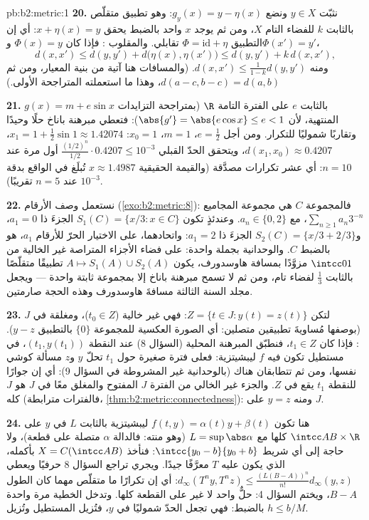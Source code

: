 \begin{solution}{pb:b2:metric:1}
\textbf{20.} نثبّت $y \in X$ ونضع $g_y(x) = y - \eta(x)$: وهو
تطبيق متقلّص بالثابت $k$ للفضاء التام $X$، ومن ثم يوجد $x$ واحد بالضبط
يحقق $x + \eta(x) = y$: أي إن التطبيق $\Phi = \mathrm{id} + \eta$
تقابلي. والمقلوب : فإذا كان $\Phi(x) = y$ و$\Phi(x') =
y'$،
\[
d(x, x') \leq d(y, y') + d\bigl(\eta(x), \eta(x')\bigr)
\leq d(y, y') + k\,d(x, x'),
\]
ومنه $d(x, x') \leq \frac{1}{1-k}d(y, y')$. (والمسافات هنا آتية
من بنية المعيار، ومن ثم $d(a - c, b - c) = d(a, b)$، وهذا ما
استعملته المتراجحة الأولى.)

\textbf{21.} $g(x) = m + e\sin x$  بالثابت $e$ على الفترة
التامة $\R$ (بمتراجحة التزايدات المنتهية، لأن $\abs{g'} = \abs{e\cos x}
\leq e < 1$): فتعطي مبرهنة باناخ حلًا وحيدًا وتقاربًا
شموليًا للتكرار. ومن أجل $e = \frac12$، $m = 1$، $x_0
= 1$: $x_1 = 1 + \frac12\sin 1 \approx 1.42074$، $d(x_1, x_0)
\approx 0.4207$، ويتحقق الحدّ القبلي
$\frac{(1/2)^n}{1/2}\cdot 0.4207 \leq 10^{-3}$ أول مرة عند
$n = 10$: أي عشر تكرارات مصدَّقة (والقيمة الحقيقية $x \approx
1.4987$ تُبلَغ في الواقع بدقة $10^{-3}$ عند $n =
5$ تقريبًا).

\textbf{22.} نستعمل وصف الأرقام
(\cref{exo:b2:metric:8}): فالمجموعة $C$ هي مجموعة المجاميع
$\sum_{n\geq1}a_n3^{-n}$، مع $a_n \in \{0, 2\}$. وعندئذٍ تكون $S_1(C) =
\{x/3 : x \in C\}$ الجزءَ ذا $a_1 = 0$، و$S_2(C) =
\{x/3 + 2/3\}$ الجزءَ ذا $a_1 = 2$: واتحادهما، على
الاختيار الحرّ للأرقام $a_1$، هو بالضبط $C$. والوحدانية بجملة
واحدة: على فضاء الأجزاء المتراصة غير الخالية من
$\intcc01$ مزوَّدًا بمسافة هاوسدورف، يكون $A \mapsto
S_1(A) \cup S_2(A)$ تطبيقًا متقلّصًا بالثابت $\frac13$ لفضاء
تام، ومن ثم لا تسمح مبرهنة باناخ إلا بمجموعة ثابتة واحدة --- ويجعل
مجلد السنة الثالثة مسافةَ هاوسدورف وهذه الحجة صارمتين.

\textbf{23.} لتكن $Z = \{t \in J : y(t) = z(t)\}$: فهي غير خالية
($t_0 \in Z$)، ومغلقة في $J$ (بوصفها مُساويةَ تطبيقين متصلين:
أي الصورة العكسية للمجموعة $\{0\}$ بالتطبيق $y - z$). : فإذا كان $t_1 \in Z$، فنطبّق
المبرهنة المحلية (السؤال 8) عند النقطة $(t_1, y(t_1))$،
في مستطيل تكون فيه $f$ ليبشيتزية: فعلى فترة صغيرة
حول $t_1$ تحلّ $y$ و$z$ مسألة كوشي نفسها، ومن ثم
تتطابقان هناك (بالوحدانية غير المشروطة في السؤال 9):
أي إن جوارًا للنقطة $t_1$ يقع في $Z$. والجزء غير الخالي من
الفترة $J$ المفتوح والمغلق معًا في $J$ هو $J$ كله
(فالفترات مترابطة،
\cref{thm:b2:metric:connectedness}): ومنه $y = z$ على $J$.

\textbf{24.} هنا تكون $f(t, y) = \alpha(t)y + \beta(t)$
ليبشيتزية بالثابت $L$ في $y$ على $\intcc AB \times \R$ كلها مع $L =
\sup\abs\alpha$ (وهو منته: فالدالة $\alpha$ متصلة على قطعة)، ولا
حاجة إلى أي شريط $\intcc{y_0 - b}{y_0 + b}$: فنأخذ $X = C(\intcc
AB)$ بأكمله، الذي يكون عليه $T$ معرَّفًا جيدًا. ويجري تراجع
السؤال 8 حرفيًا ويعطي $d_\infty(T^ny, T^nz) \leq
\frac{(L(B - A))^n}{n!}d_\infty(y, z)$: أي إن تكرارًا ما
متقلّص مهما كان الطول $B - A$، ويختم السؤال 4:
حلٌّ واحد لا غير على القطعة كلها.
وتدخل الخطية مرة واحدة بالضبط: فهي تجعل الحدّ 
شموليًا في $y$، فتُزيل المستطيل وتُزيل $h \leq b/M$.


\end{solution}
